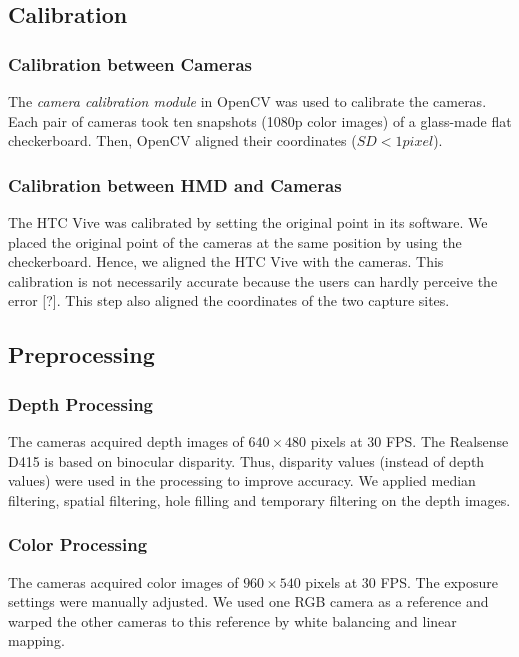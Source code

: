 \subsection{Calibration}

\subsubsection{Calibration between Cameras}

The \emph{camera calibration module} in OpenCV was used to calibrate the cameras. Each pair of cameras took ten snapshots (1080p color images) of a glass-made flat checkerboard. Then, OpenCV aligned their coordinates ($SD < 1 pixel$).

\subsubsection{Calibration between HMD and Cameras}

The HTC Vive was calibrated by setting the original point in its software. We placed the original point of the cameras at the same position by using the checkerboard. Hence, we aligned the HTC Vive with the cameras. This calibration is not necessarily accurate because the users can hardly perceive the error [?]. This step also aligned the coordinates of the two capture sites.

\subsection{Preprocessing}

\subsubsection{Depth Processing}

The cameras acquired depth images of $640 \times 480$ pixels at 30 FPS. The Realsense D415 is based on binocular disparity. Thus, disparity values (instead of depth values) were used in the processing to improve accuracy. We applied median filtering, spatial filtering, hole filling and temporary filtering on the depth images.

\subsubsection{Color Processing}

The cameras acquired color images of $960 \times 540$ pixels at 30 FPS. The exposure settings were manually adjusted. We used one RGB camera as a reference and warped the other cameras to this reference by white balancing and linear mapping.

